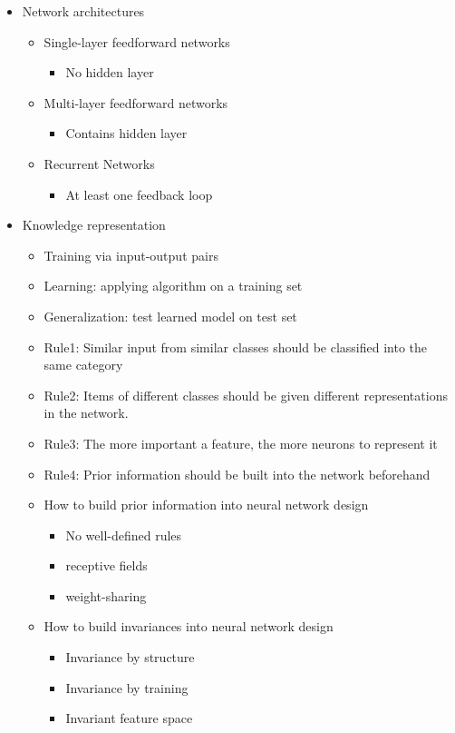 \documentclass[paper=a4, fontsize=11pt]{scrartcl} %
\numberwithin{equation}{section} %
\numberwithin{figure}{section} %
\numberwithin{table}{section} %
\begin{document}
\begin{itemize}
\item Network architectures
	\begin{itemize}
		\item Single-layer feedforward networks
		\begin{itemize}
			\item No hidden layer
		\end{itemize}
		\item Multi-layer feedforward networks
		\begin{itemize}
			\item Contains hidden layer
		\end{itemize}
		\item Recurrent Networks
		\begin{itemize}
			\item At least one feedback loop
		\end{itemize}
	\end{itemize}


\item Knowledge representation
\begin{itemize}
	\item Training via input-output pairs
	\item Learning: applying algorithm on a training set
	\item Generalization: test learned model on test set
	\item Rule1: Similar input from similar classes should be classified into the same category
	\item Rule2: Items of different classes should be given different representations in the network.
	\item Rule3: The more important a feature, the more neurons to represent it
	\item Rule4: Prior information should be built into the network beforehand
	\item How to build prior information into neural network design
	\begin{itemize}
		\item No well-defined rules
		\item receptive fields
		\item weight-sharing
	\end{itemize}
	\item How to build invariances into neural network design
	\begin{itemize}
		\item Invariance by structure
		\item Invariance by training
		\item Invariant feature space
	\end{itemize}
\end{itemize}


\end{itemize}
\end{document}
